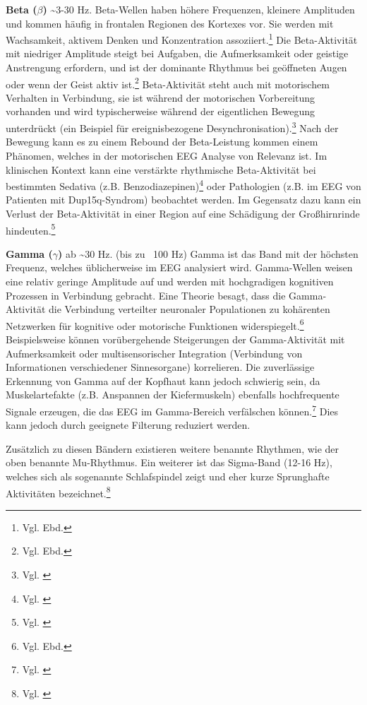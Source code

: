 \textbf{Beta ($\beta$)} \textasciitilde 3-30 Hz. Beta-Wellen haben höhere Frequenzen, kleinere Amplituden und kommen häufig in frontalen Regionen des Kortexes vor. Sie werden mit Wachsamkeit, aktivem Denken und Konzentration assoziiert.\footnote{Vgl. Ebd.} Die Beta-Aktivität mit niedriger Amplitude steigt bei Aufgaben, die Aufmerksamkeit oder geistige Anstrengung erfordern, und ist der dominante Rhythmus bei geöffneten Augen oder wenn der Geist aktiv ist.\footnote{Vgl. Ebd.} Beta-Aktivität steht auch mit motorischem Verhalten in Verbindung, sie ist während der motorischen Vorbereitung vorhanden und wird typischerweise während der eigentlichen Bewegung unterdrückt (ein Beispiel für ereignisbezogene Desynchronisation).\footnote{Vgl. \cite{wiki_eeg_english}} Nach der Bewegung kann es zu einem Rebound der Beta-Leistung kommen einem Phänomen, welches in der motorischen EEG Analyse von Relevanz ist. Im klinischen Kontext kann eine verstärkte rhythmische Beta-Aktivität bei bestimmten Sedativa (z.B. Benzodiazepinen)\footnote{Vgl. \cite{vanlier2004}} oder Pathologien (z.B. im EEG von Patienten mit Dup15q-Syndrom) beobachtet werden. Im Gegensatz dazu kann ein Verlust der Beta-Aktivität in einer Region auf eine Schädigung der Großhirnrinde hindeuten.\footnote{Vgl. \cite{wiki_eeg_english}}

\textbf{Gamma ($\gamma$)} ab \textasciitilde 30 Hz. (bis zu ~100 Hz) Gamma ist das Band mit der höchsten Frequenz, welches üblicherweise im EEG analysiert wird. Gamma-Wellen weisen eine relativ geringe Amplitude auf und werden mit hochgradigen kognitiven Prozessen in Verbindung gebracht. Eine Theorie besagt, dass die Gamma-Aktivität die Verbindung verteilter neuronaler Populationen zu kohärenten Netzwerken für kognitive oder motorische Funktionen widerspiegelt.\footnote{Vgl. Ebd.} Beispielsweise können vorübergehende Steigerungen der Gamma-Aktivität mit Aufmerksamkeit oder multisensorischer Integration (Verbindung von Informationen verschiedener Sinnesorgane) korrelieren. Die zuverlässige Erkennung von Gamma auf der Kopfhaut kann jedoch schwierig sein, da Muskelartefakte (z.B. Anspannen der Kiefermuskeln) ebenfalls hochfrequente Signale erzeugen, die das EEG im Gamma-Bereich verfälschen können.\footnote{Vgl. \cite{jia2011}}  Dies kann jedoch durch geeignete Filterung reduziert werden. 

Zusätzlich zu diesen Bändern existieren weitere benannte Rhythmen, wie der oben benannte Mu-Rhythmus. Ein weiterer ist das Sigma-Band (12-16 Hz), welches sich als sogenannte Schlafspindel zeigt und eher kurze Sprunghafte Aktivitäten bezeichnet.\footnote{Vgl. \cite{uchida1991}}

